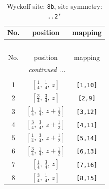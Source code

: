 \documentclass[fleqn,8pt]{jsarticle}
\begin{document}
\begin{longtable}{ccc}
\caption{Wyckoff site: {\tt 8b}, site symmetry: {\tt ..2'}}
 \\
 \hline \hline
No. & position & mapping \\ \hline \endfirsthead

\multicolumn{2}{l}{\tablename\ \thetable{}} \\
 \hline \hline
No. & position & mapping \\ \hline \endhead

 \hline \hline
\multicolumn{2}{r}{\footnotesize\it continued ...} \\ \endfoot

 \hline \hline
\multicolumn{2}{r}{} \\ \endlastfoot

1 & $\left[ \frac{1}{4},\, \frac{1}{4},\, z \right]$ & {\tt [1,10]} \\ \hline
2 & $\left[ \frac{3}{4},\, \frac{3}{4},\, z \right]$ & {\tt [2,9]} \\ \hline
3 & $\left[ \frac{1}{4},\, \frac{1}{4},\, z + \frac{1}{2} \right]$ & {\tt [3,12]} \\ \hline
4 & $\left[ \frac{3}{4},\, \frac{3}{4},\, z + \frac{1}{2} \right]$ & {\tt [4,11]} \\ \hline
5 & $\left[ \frac{1}{4},\, \frac{3}{4},\, z + \frac{1}{2} \right]$ & {\tt [5,14]} \\ \hline
6 & $\left[ \frac{3}{4},\, \frac{1}{4},\, z + \frac{1}{2} \right]$ & {\tt [6,13]} \\ \hline
7 & $\left[ \frac{1}{4},\, \frac{3}{4},\, z \right]$ & {\tt [7,16]} \\ \hline
8 & $\left[ \frac{3}{4},\, \frac{1}{4},\, z \right]$ & {\tt [8,15]} \\
\end{longtable}
\renewcommand{\arraystretch}{1.2}
\end{document}
